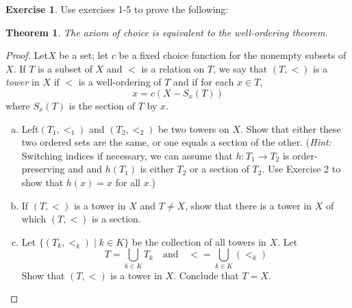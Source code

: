 \documentclass[11pt,a4paper,twoside]{article}
\theoremstyle{definition}
\newcounter{excounter}
\newtheorem{exercise}[excounter]{Exercise}
\theoremstyle{plain}
\newtheorem*{theorem}{Theorem}
\begin{document}
\begin{exercise}

  Use exercises 1-5 to prove the following:
  
  \bigskip
  \begin{theorem}
    The axiom of choice is equivalent to the well-ordering theorem.
  \end{theorem}

\end{exercise}

\begin{proof}

  Let$X$ be a set; let $c$ be a fixed choice function for the nonempty subsets of $X$. If $T$ is
  a subset of $X$ and $<$ is a relation on $T$, we say that $( T, < )$ is a \emph{tower} in $X$ if
  $<$ is a well-ordering of $T$ and if for each $x \in T$,
  \begin{equation*}
    x = c \left( X - S_x \left( T \right) \right)
  \end{equation*}
  where $S_x ( T )$ is the section of $T$ by $x$.
  \begin{enumerate}[(a)]

  \item Left$( T_1 , <_1 )$ and $( T_2, <_2 )$ be two towers on $X$. Show that either these two ordered sets
    are the same, or one equals a section of the other. (\emph{Hint:} Switching indices if necessary, we can
    assume that $h \colon T_1 \to T_2$ is order-preserving and and $h ( T_1 )$ is either $T_2$ or a section of $T_2$.
    Use Exercise 2 to show that $h ( x ) = x$ for all $x$.)

  \item If $( T, < )$ is a tower in $X$ and $T \neq X$, show that there is a tower in $X$ of which $( T, < )$
    is a section.

  \item Let $\{ ( T_k, <_k ) \mid k \in K \}$ be the collection of all towers in $X$. Let
    \begin{equation*}
      T = \bigcup_{k \in K} T_k \quad\text{and}\quad < = \bigcup_{k \in K} ( <_k )
    \end{equation*}
    Show that $( T, < )$ is a tower in $X$. Conclude that $T = X$.

  \end{enumerate}

\end{proof}
\end{document}
